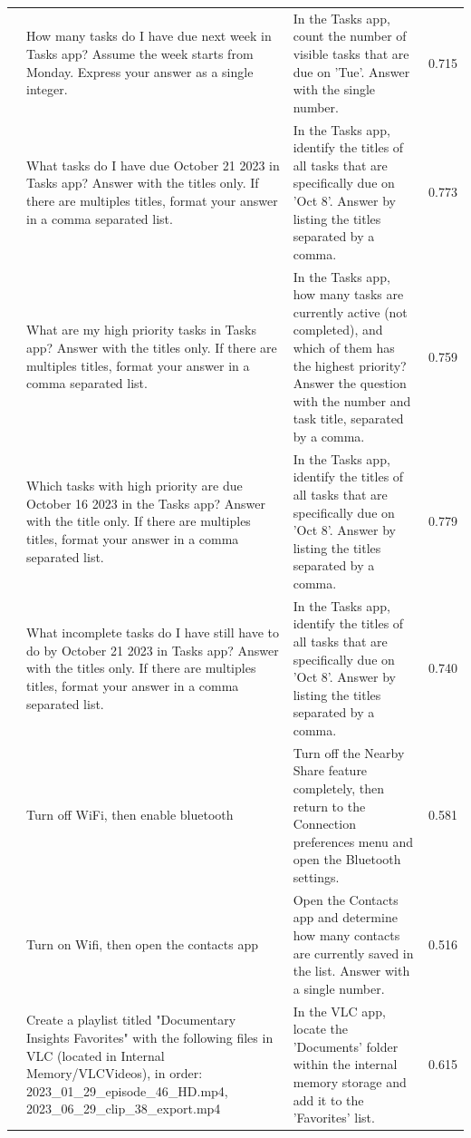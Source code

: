 \documentclass{article} %
\begin{document}
\begin{scriptsize}
\begin{longtable}{@{} c >{\raggedright\arraybackslash}p{} >{\raggedright\arraybackslash}p{} c @{}}
\addlinespace[2pt]
108 & How many tasks do I have due next week in Tasks app? Assume the week starts from Monday. Express your answer as a single integer. & In the Tasks app, count the number of visible tasks that are due on 'Tue'. Answer with the single number. & 0.715 \\
\addlinespace[2pt]
109 & What tasks do I have due October 21 2023 in Tasks app? Answer with the titles only. If there are multiples titles, format your answer in a comma separated list. & In the Tasks app, identify the titles of all tasks that are specifically due on 'Oct 8'. Answer by listing the titles separated by a comma. & 0.773 \\
\addlinespace[2pt]
110 & What are my high priority tasks in Tasks app? Answer with the titles only. If there are multiples titles, format your answer in a comma separated list. & In the Tasks app, how many tasks are currently active (not completed), and which of them has the highest priority? Answer the question with the number and task title, separated by a comma. & 0.759 \\
\addlinespace[2pt]
111 & Which tasks with high priority are due October 16 2023 in the Tasks app? Answer with the title only. If there are multiples titles, format your answer in a comma separated list. & In the Tasks app, identify the titles of all tasks that are specifically due on 'Oct 8'. Answer by listing the titles separated by a comma. & 0.779 \\
\addlinespace[2pt]
112 & What incomplete tasks do I have still have to do by October 21 2023 in Tasks app? Answer with the titles only. If there are multiples titles, format your answer in a comma separated list. & In the Tasks app, identify the titles of all tasks that are specifically due on 'Oct 8'. Answer by listing the titles separated by a comma. & 0.740 \\
\addlinespace[2pt]
113 & Turn off WiFi, then enable bluetooth & Turn off the Nearby Share feature completely, then return to the Connection preferences menu and open the Bluetooth settings. & 0.581 \\
\addlinespace[2pt]
114 & Turn on Wifi, then open the contacts app & Open the Contacts app and determine how many contacts are currently saved in the list. Answer with a single number. & 0.516 \\
\addlinespace[2pt]
115 & Create a playlist titled "Documentary Insights Favorites" with the following files in VLC (located in Internal Memory/VLCVideos), in order: 2023\_01\_29\_episode\_46\_HD.mp4, 2023\_06\_29\_clip\_38\_export.mp4 & In the VLC app, locate the 'Documents' folder within the internal memory storage and add it to the 'Favorites' list. & 0.615 \\

\end{longtable}
\end{scriptsize}
\end{document}
